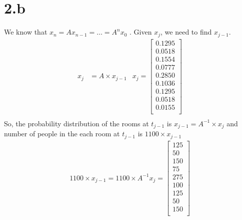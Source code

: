 \documentclass[letterpaper,12pt,titlepage,oneside,final]{book}
\begin{document}
\section*{2.b}
We know that $x_n = A x_{n-1} = \hdots = A^n x_0 $ . Given $x_j$, we need to find $x_{j-1}$.
\begin{align*}
x_j &=  A \times x_{j-1} &x_j = \begin{bmatrix}    
	0.1295\\
    0.0518\\
    0.1554\\
    0.0777\\
    0.2850\\
    0.1036\\
    0.1295\\
    0.0518\\
    0.0155\\
    \end{bmatrix}\\
\end{align*}
So, the probability distribution of the rooms at $t_{j-1}$ is $x_{j-1} =  A^{-1} \times x_{j}$ and number of people in the each room at $t_{j-1}$ is $1100 \times x_{j-1}$ 
\begin{align*}
1100\times x_{j-1} = 1100\times A^{-1}x_j =
\begin{bmatrix} 
   125\\
    50\\
   150\\
    75\\
   275\\
   100\\
   125\\
    50\\
   150\\ 
\end{bmatrix}
\end{align*}
\end{document}
